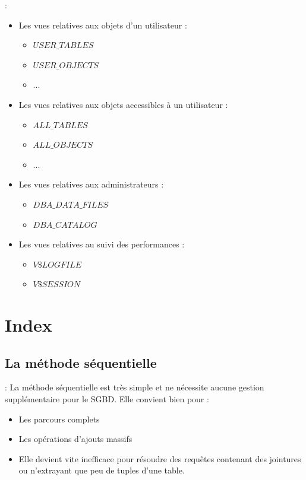 \documentclass[10pt]{beamer}
\begin{document}
\begin{frame}{\secname : \subsecname}
    \begin{itemize}
        \item Les vues relatives aux objets d'un utilisateur :
              \begin{itemize}
                  \item $USER\_TABLES$
                  \item $USER\_OBJECTS$
                  \item ...
              \end{itemize}
        \item Les vues relatives aux objets accessibles à un utilisateur :
              \begin{itemize}
                  \item $ALL\_TABLES$
                  \item $ALL\_OBJECTS$
                  \item ...
              \end{itemize}
        \item Les vues relatives aux administrateurs :
              \begin{itemize}
                  \item $DBA\_DATA\_FILES$
                  \item $DBA\_CATALOG$
              \end{itemize}

        \item Les vues relatives au suivi des performances :
              \begin{itemize}
                  \item $V\$LOGFILE$
                  \item $V\$SESSION$
              \end{itemize}
    \end{itemize}
\end{frame}
\section{Index}
\tocss
\subsection{La méthode séquentielle}
\begin{frame}{\secname : \subsecname}
    La méthode séquentielle est très simple et ne nécessite aucune gestion supplémentaire pour le SGBD.
    Elle convient bien pour :
    \begin{itemize}
        \item Les parcours complets
        \item Les opérations d'ajouts massifs
        \item Elle devient vite inefficace pour résoudre des requêtes contenant des jointures ou n'extrayant que peu de tuples d'une table.
    \end{itemize}
\end{frame}
\end{document}
